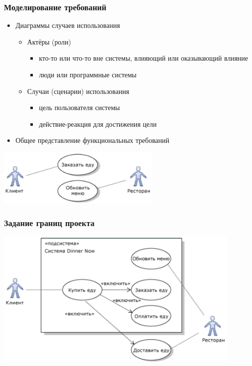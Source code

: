 \documentclass{../../slides-style}
\begin{document}
    \begin{frame}
        \frametitle{Моделирование требований}
        \begin{itemize}
            \item Диаграммы случаев использования
            \begin{itemize}
                \item Актёры (роли)
                \begin{itemize}
                    \item кто-то или что-то вне системы, влияющий или оказывающий влияние
                    \item люди или программные системы
                \end{itemize}
                \item Случаи (сценарии) использования
                \begin{itemize}
                    \item цель пользователя системы
                    \item действие-реакция для достижения цели
                \end{itemize}
            \end{itemize}
            \item Общее представление функциональных требований
        \end{itemize}
        \begin{center}
            \includegraphics[width=0.6\textwidth]{useCaseSmallExample.png}
        \end{center}
    \end{frame}

    \begin{frame}
        \frametitle{Задание границ проекта}
        \begin{center}
            \includegraphics[width=0.9\textwidth]{useCaseBiggerExample.png}
        \end{center}
    \end{frame}
\end{document}
